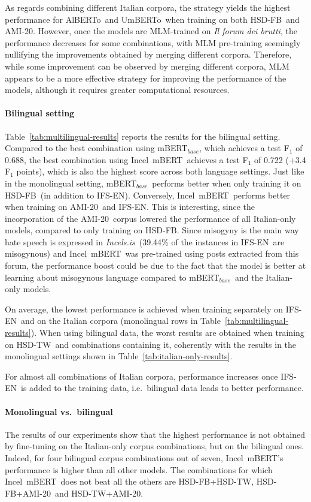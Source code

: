 \documentclass[
twocolumn,
]{ceurart}
\newcommand{\dsENclassification}{IFS-EN}
\newcommand{\mbert}{\mbox{mBERT$_{base}$}}
\newcommand{\imbert}{\mbox{Incel mBERT}}
\newcommand{\umbert}{\mbox{UmBERTo}}
\newcommand{\albert}{\mbox{AlBERTo}}
\newcommand{\hsdfb}{\mbox{HSD-FB}}
\newcommand{\hsdtw}{\mbox{HSD-TW}}
\newcommand{\ami}{\mbox{AMI-20}}
\newcommand{\enforum}{\textit{Incels.is}}
\newcommand{\itforum}{\textit{Il forum dei brutti}}
\begin{document}
As regards combining different Italian corpora, the strategy yields the highest performance for \albert\, and \umbert\, when training on both \hsdfb\, and \ami.
However, once the models are MLM-trained on \itforum, the performance decreases for some combinations, with MLM pre-training seemingly nullifying the improvements obtained by merging different corpora. Therefore, while some improvement can be observed by merging different corpora, MLM appears to be a more effective strategy for improving the performance of the models, although it requires greater computational resources.

\paragraph{Bilingual setting}
Table~\ref{tab:multilingual-results} reports the results for the bilingual setting.
Compared to the best combination using \mbert, which achieves a test F$_1$ of 0.688, the best combination using \imbert\, achieves a test F$_1$ of 0.722 (+3.4 F$_1$ points), which is also the highest score across both language settings. Just like in the monolingual setting, \mbert\, performs better when only training it on \hsdfb\, (in addition to \dsENclassification). Conversely, \imbert\, performs better when training on \ami\, and \dsENclassification. This is interesting, since the incorporation of the \ami\, corpus lowered the performance of all Italian-only models, compared to only training on \hsdfb. Since misogyny is the main way hate speech is expressed in \enforum\, (39.44\% of the instances in \dsENclassification\, are misogynous) and
\imbert\, was pre-trained using posts extracted from this forum, the performance boost could be due to the fact that the model is better at learning about misogynous language compared to \mbert\, and the Italian-only models.

On average, the lowest performance is achieved when training separately on \dsENclassification\, and on the Italian corpora (monolingual rows in Table~\ref{tab:multilingual-results}). When using bilingual data, the worst results are obtained when training on \hsdtw\, and combinations containing it, coherently with the results in the monolingual settings shown in \mbox{Table~\ref{tab:italian-only-results}}.

For almost all combinations of Italian corpora, performance increases once \dsENclassification\, is added to the training data, i.e.\, bilingual data leads to better performance.

\paragraph{Monolingual vs.\ bilingual}
The results of our experiments show that the highest performance is not obtained by fine-tuning on the Italian-only corpus combinations, but on the bilingual ones. Indeed, for four bilingual corpus combinations out of seven, \imbert's performance is higher than all other models.
The combinations for which \imbert\, does not beat all the others are \hsdfb+\hsdtw, \hsdfb+\ami\, and \hsdtw+\ami.
\end{document}
